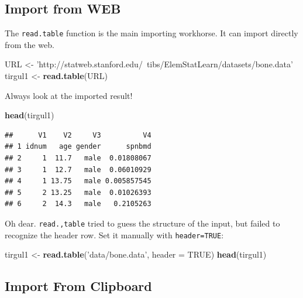 \documentclass[]{book}
\newenvironment{Shaded}{\begin{snugshade}}{\end{snugshade}}
\newcommand{\DataTypeTok}[1]{\textcolor[rgb]{0.13,0.29,0.53}{#1}}
\newcommand{\KeywordTok}[1]{\textcolor[rgb]{0.13,0.29,0.53}{\textbf{#1}}}
\newcommand{\NormalTok}[1]{#1}
\newcommand{\OtherTok}[1]{\textcolor[rgb]{0.56,0.35,0.01}{#1}}
\newcommand{\StringTok}[1]{\textcolor[rgb]{0.31,0.60,0.02}{#1}}
\theoremstyle{definition}
\theoremstyle{definition}
\theoremstyle{definition}
\theoremstyle{remark}
\begin{document}
\hypertarget{import-from-web}{%
\subsection{Import from WEB}\label{import-from-web}}

The \texttt{read.table} function is the main importing workhorse.
It can import directly from the web.

\begin{Shaded}
\begin{Highlighting}[]
\NormalTok{URL <-}\StringTok{ 'http://statweb.stanford.edu/~tibs/ElemStatLearn/datasets/bone.data'}
\NormalTok{tirgul1 <-}\StringTok{ }\KeywordTok{read.table}\NormalTok{(URL)}
\end{Highlighting}
\end{Shaded}

Always look at the imported result!

\begin{Shaded}
\begin{Highlighting}[]
\KeywordTok{head}\NormalTok{(tirgul1)}
\end{Highlighting}
\end{Shaded}

\begin{verbatim}
##      V1    V2     V3          V4
## 1 idnum   age gender      spnbmd
## 2     1  11.7   male  0.01808067
## 3     1  12.7   male  0.06010929
## 4     1 13.75   male 0.005857545
## 5     2 13.25   male  0.01026393
## 6     2  14.3   male   0.2105263
\end{verbatim}

Oh dear.
\texttt{read.,table} tried to guess the structure of the input, but failed to recognize the header row. Set it manually with \texttt{header=TRUE}:

\begin{Shaded}
\begin{Highlighting}[]
\NormalTok{tirgul1 <-}\StringTok{ }\KeywordTok{read.table}\NormalTok{(}\StringTok{'data/bone.data'}\NormalTok{, }\DataTypeTok{header =} \OtherTok{TRUE}\NormalTok{) }
\KeywordTok{head}\NormalTok{(tirgul1)}
\end{Highlighting}
\end{Shaded}

\hypertarget{import-from-clipboard}{%
\subsection{Import From Clipboard}\label{import-from-clipboard}}
\end{document}
